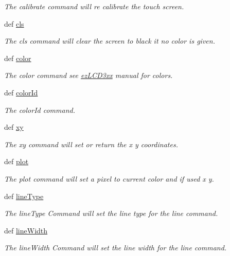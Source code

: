 \begin{DoxyCompactItemize}
\begin{DoxyCompactList}\small\item\em The calibrate command will re calibrate the touch screen. \end{DoxyCompactList}\item 
def \hyperlink{group___drawing_gacdfb97b09494d0e3cec787014c4863f9}{cls}
\begin{DoxyCompactList}\small\item\em The cls command will clear the screen to black it no color is given. \end{DoxyCompactList}\item 
def \hyperlink{group___drawing_ga306a0e99b15bc1122683a1c6e18e7ef0}{color}
\begin{DoxyCompactList}\small\item\em The color command see \hyperlink{namespaceez_l_c_d3xx}{ez\-L\-C\-D3xx} manual for colors. \end{DoxyCompactList}\item 
def \hyperlink{group___drawing_ga94dd8d046a01670fc2212b548e29e8d0}{color\-Id}
\begin{DoxyCompactList}\small\item\em The color\-Id command. \end{DoxyCompactList}\item 
def \hyperlink{group___drawing_gaf249f02b6ad4e734ffa9d8371f6cab8a}{xy}
\begin{DoxyCompactList}\small\item\em The xy command will set or return the x y coordinates. \end{DoxyCompactList}\item 
def \hyperlink{group___drawing_gad3c0ce418a0feea4a0fa40f803c90196}{plot}
\begin{DoxyCompactList}\small\item\em The plot command will set a pixel to current color and if used x y. \end{DoxyCompactList}\item 
def \hyperlink{group___drawing_ga9dc821ce2652535899c584d4ff1c1bf7}{line\-Type}
\begin{DoxyCompactList}\small\item\em The line\-Type Command will set the line type for the line command. \end{DoxyCompactList}\item 
def \hyperlink{group___drawing_ga87b2625e7e4ffa927b4471003f8c6e70}{line\-Width}
\begin{DoxyCompactList}\small\item\em The line\-Width Command will set the line width for the line command. \end{DoxyCompactList}\item 

\end{DoxyCompactItemize}
